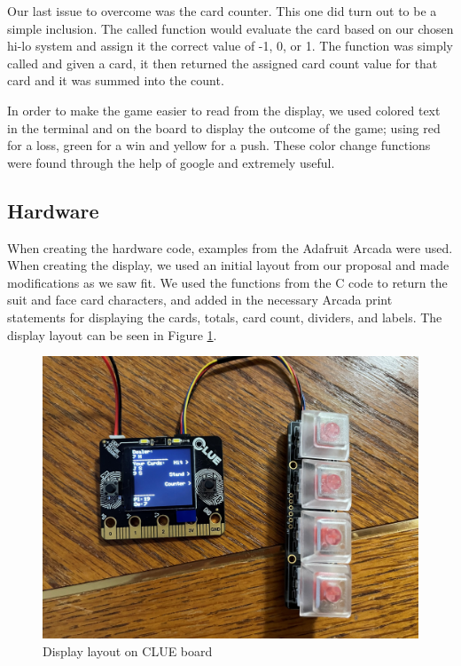 \documentclass[12pt]{article}
\begin{document}
Our last issue to overcome was the card counter. This one did turn out to be a simple inclusion. The called function would evaluate the card based on our chosen hi-lo system and assign it the correct value of -1, 0, or 1. The function was simply called and given a card, it then returned the assigned card count value for that card and it was summed into the count.

In order to make the game easier to read from the display, we used colored text in the terminal and on the board to display the outcome of the game; using red for a loss, green for a win and yellow for a push. These color change functions \cite{colors} were found through the help of google and extremely useful.

\subsection{Hardware}
When creating the hardware code, examples from the Adafruit Arcada \cite{arcada} were used. When creating the display, we used an initial layout from our proposal and made modifications as we saw fit. We used the functions from the C code to return the suit and face card characters, and added in the necessary Arcada print statements for displaying the cards, totals, card count, dividers, and labels. The display layout can be seen in Figure \ref{fig:display}.
\begin{figure}[ht]
  \centering
  \includegraphics[width=6in]{display.jpg}
  \caption{Display layout on CLUE board}
  \label{fig:display}
  \end{figure}
\end{document}
